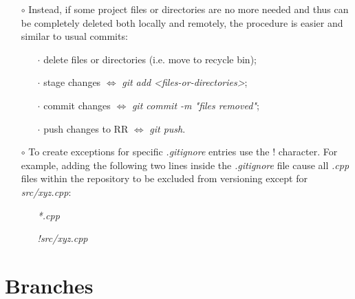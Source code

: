 \documentclass[a4paper,portrait,10pt]{article}   %
\newcommand{\mydiv}{$\Leftrightarrow$ }   %
\newcommand{\mysapo}[1]{\textquotesingle #1\textquotesingle }   %
\newcommand{\myvspace}{\vspace{4mm}}   %
\begin{document}
\begin{itemize}
\item[$\circ$] Instead, if some project files or directories are no more needed and thus can be completely deleted both locally and remotely, the procedure is easier and similar to usual commits:
\begin{itemize}
  \item[$\cdot$] delete files or directories (i.e. move to recycle bin);
  \item[$\cdot$] stage changes \mydiv \textit{git add <files-or-directories>};
  \item[$\cdot$] commit changes \mydiv \textit{git commit -m "files removed"};
  \item[$\cdot$] push changes to RR \mydiv \textit{git push}.
\end{itemize}
\myvspace

\item[$\circ$] To create exceptions for specific \textit{.gitignore} entries use the \mysapo{!} character. For example, adding the following two lines inside the \textit{.gitignore} file cause all \textit{.cpp} files within the repository to be excluded from versioning except for \textit{src/xyz.cpp}:
\begin{itemize}
  \item[] \textit{*.cpp}
  \item[] \textit{!src/xyz.cpp}
\end{itemize}
\end{itemize}
\myvspace


\section{Branches}   \label{sec:Branches}
\end{document}
